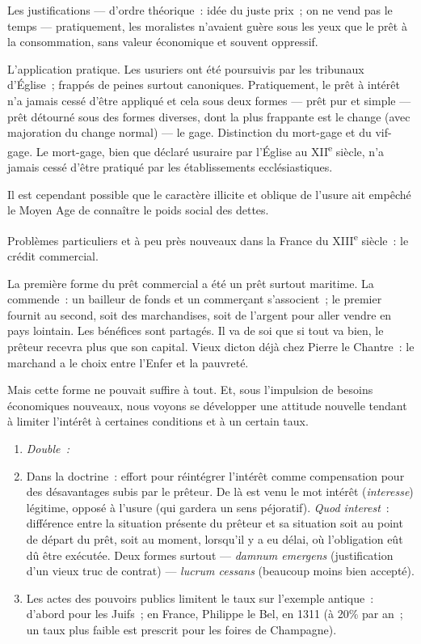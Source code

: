 \documentclass[french,twoside]{book} %
\newlength{\listmod}
\newcommand{\listhead}[1]{\hspace{-1\listmod}\emph{#1}}
\begin{document}
Les justifications — d’ordre théorique : idée du juste prix ; on ne vend pas le temps — pratiquement, les moralistes n’avaient guère sous les yeux que le prêt à la consommation, sans valeur économique et souvent oppressif.\par
L’application pratique. Les usuriers ont été poursuivis par les tribunaux d’Église ; frappés de peines surtout canoniques. Pratiquement, le prêt à intérêt n’a jamais cessé d’être appliqué et cela sous deux formes — prêt pur et simple — prêt détourné sous des formes diverses, dont la plus frappante est le change (avec majoration du change normal) — le gage. Distinction du mort-gage et du vif-gage. Le mort-gage, bien que déclaré usuraire par l’Église au XII\textsuperscript{e} siècle, n’a jamais cessé d’être pratiqué par les établissements ecclésiastiques.\par
Il est cependant possible que le caractère illicite et oblique de l’usure ait empêché le Moyen Age de connaître le poids social des dettes.\par
Problèmes particuliers et à peu près nouveaux dans la France du XIII\textsuperscript{e} siècle : le crédit commercial.\par
\label{p95} La première forme du prêt commercial a été un prêt surtout maritime. La commende : un bailleur de fonds et un commerçant s’associent ; le premier fournit au second, soit des marchandises, soit de l’argent pour aller vendre en pays lointain. Les bénéfices sont partagés. Il va de soi que si tout va bien, le prêteur recevra plus que son capital. Vieux dicton déjà chez Pierre le Chantre : le marchand a le choix entre l’Enfer et la pauvreté.\par
Mais cette forme ne pouvait suffire à tout. Et, sous l’impulsion de besoins économiques nouveaux, nous voyons se développer une attitude nouvelle tendant à limiter l’intérêt à certaines conditions et à un certain taux.\par

\begin{enumerate}[itemsep=0pt,]
\item[]\listhead{Double :}
\item Dans la doctrine : effort pour réintégrer l’intérêt comme compensation pour des désavantages subis par le prêteur. De là est venu le mot intérêt ({\itshape interesse}) légitime, opposé à l’usure (qui gardera un sens péjoratif). {\itshape Quod interest} : différence entre la situation présente du prêteur et sa situation soit au point de départ du prêt, soit au moment, lorsqu’il y a eu délai, où l’obligation eût dû être exécutée. Deux formes surtout — {\itshape damnum emergens} (justification d’un vieux truc de contrat) — {\itshape lucrum cessans} (beaucoup moins bien accepté).
\item Les actes des pouvoirs publics limitent le taux sur l’exemple antique : d’abord pour les Juifs ; en France, Philippe le Bel, en 1311 (à 20\% par an ; un taux plus faible est prescrit pour les foires de Champagne).
\end{enumerate}
\end{document}
